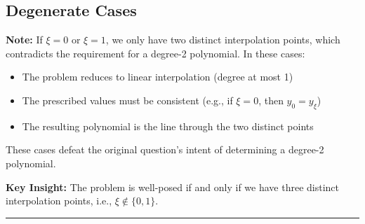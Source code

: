 \subsection*{Degenerate Cases}

\textbf{Note:} If $\xi = 0$ or $\xi = 1$, we only have two distinct interpolation points, which contradicts the requirement for a degree-2 polynomial. In these cases:
\begin{itemize}
\item The problem reduces to linear interpolation (degree at most 1)
\item The prescribed values must be consistent (e.g., if $\xi = 0$, then $y_0 = y_\xi$)
\item The resulting polynomial is the line through the two distinct points
\end{itemize}

These cases defeat the original question's intent of determining a degree-2 polynomial.

\textbf{Key Insight:} The problem is well-posed if and only if we have three distinct interpolation points, i.e., $\xi \notin \{0, 1\}$.

\vspace{2em}
\noindent\rule{\textwidth}{0.4pt}
